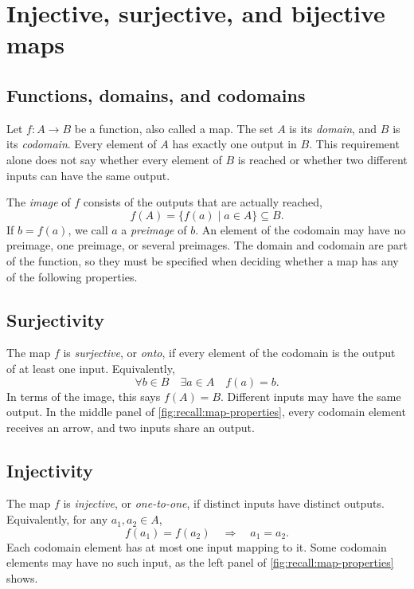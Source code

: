 \section{Injective, surjective, and bijective maps}
\label{sec:appendix:map-properties}

\subsection{Functions, domains, and codomains}

Let \(f:A\to B\) be a function, also called a map. The set \(A\) is its
\emph{domain}, and \(B\) is its \emph{codomain}. Every element of \(A\)
has exactly one output in \(B\). This requirement alone does not say
whether every element of \(B\) is reached or whether two different
inputs can have the same output.

The \emph{image} of \(f\) consists of the outputs that are actually reached,
\[
  f(A)=\{f(a)\mid a\in A\}\subseteq B.
\]
If \(b=f(a)\), we call \(a\) a \emph{preimage} of \(b\). An element of
the codomain may have no preimage, one preimage, or several preimages.
The domain and codomain are part of the function, so they must be specified
when deciding whether a map has any of the following properties.

\subsection{Surjectivity}

The map \(f\) is \emph{surjective}, or \emph{onto}, if every element
of the codomain is the output of at least one input. Equivalently,
\[
  \forall b\in B\quad \exists a\in A\quad f(a)=b.
\]
In terms of the image, this says \(f(A)=B\).
Different inputs may have the same output. In the middle panel of
\autoref{fig:recall:map-properties}, every codomain element receives
an arrow, and two inputs share an output.

\subsection{Injectivity}

The map \(f\) is \emph{injective}, or \emph{one-to-one}, if distinct
inputs have distinct outputs. Equivalently, for any \(a_1,a_2\in A\),
\[
  f(a_1)=f(a_2)\quad\Longrightarrow\quad a_1=a_2.
\]
Each codomain element has at most one input mapping to it. Some
codomain elements may have no such input, as the left panel of
\autoref{fig:recall:map-properties} shows.

